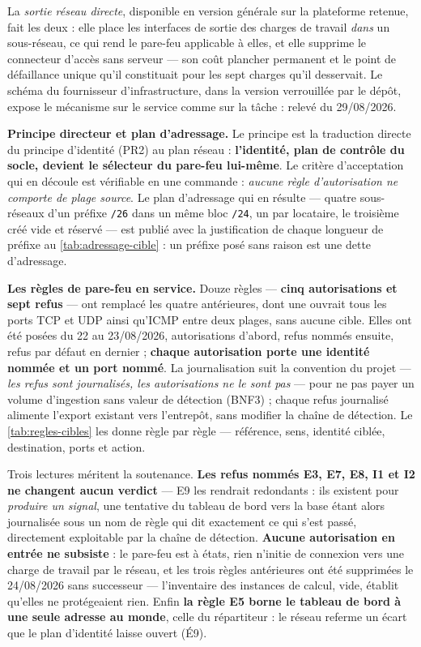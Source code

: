La \emph{sortie réseau directe}, disponible en version générale sur la plateforme retenue, fait les
deux : elle place les interfaces de sortie des charges de travail \emph{dans} un sous-réseau, ce
qui rend le pare-feu applicable à elles, et elle supprime le connecteur d'accès sans serveur ---
son coût plancher permanent et le point de défaillance unique qu'il constituait pour les sept
charges qu'il desservait. Le schéma du fournisseur d'infrastructure, dans la version verrouillée
par le dépôt, expose le mécanisme sur le service comme sur la tâche : relevé du 29/08/2026.

\medskip
\noindent\textbf{Principe directeur et plan d'adressage.}
Le principe est la traduction directe du principe d'identité (PR2) au plan réseau :
\textbf{l'identité, plan de contrôle du socle, devient le sélecteur du pare-feu lui-même}. Le
critère d'acceptation qui en découle est vérifiable en une commande : \emph{aucune règle
d'autorisation ne comporte de plage source}. Le plan d'adressage qui en résulte --- quatre
sous-réseaux d'un préfixe \texttt{/26} dans un même bloc \texttt{/24}, un par locataire, le
troisième créé vide et réservé --- est publié avec la justification de chaque longueur de préfixe
au \cref{tab:adressage-cible} : un préfixe posé sans raison est une dette d'adressage.


\medskip
\noindent\textbf{Les règles de pare-feu en service.}
Douze règles --- \textbf{cinq autorisations et sept refus} --- ont remplacé les quatre antérieures,
dont une ouvrait tous les ports TCP et UDP ainsi qu'ICMP entre deux plages, sans aucune cible.
Elles ont été posées du 22 au 23/08/2026, autorisations d'abord, refus nommés ensuite, refus par
défaut en dernier ; \textbf{chaque autorisation porte une identité nommée et un port nommé}. La
journalisation suit la convention du projet --- \emph{les refus sont journalisés, les autorisations
ne le sont pas} --- pour ne pas payer un volume d'ingestion sans valeur de détection (BNF3) ; chaque
refus journalisé alimente l'export existant vers l'entrepôt, sans modifier la chaîne de détection.
Le \cref{tab:regles-cibles} les donne règle par règle --- référence, sens, identité ciblée,
destination, ports et action.


Trois lectures méritent la soutenance. \textbf{Les refus nommés E3, E7, E8, I1 et I2 ne changent
aucun verdict} --- E9 les rendrait redondants : ils existent pour \emph{produire un signal}, une
tentative du tableau de bord vers la base étant alors journalisée sous un nom de règle qui dit
exactement ce qui s'est passé, directement exploitable par la chaîne de détection. \textbf{Aucune
autorisation en entrée ne subsiste} : le pare-feu est à états, rien n'initie de connexion vers une
charge de travail par le réseau, et les trois règles antérieures ont été supprimées le 24/08/2026
sans successeur --- l'inventaire des instances de calcul, vide, établit qu'elles ne protégeaient
rien. Enfin \textbf{la règle E5 borne le tableau de bord à une seule adresse au monde}, celle du
répartiteur : le réseau referme un écart que le plan d'identité laisse ouvert (É9).

